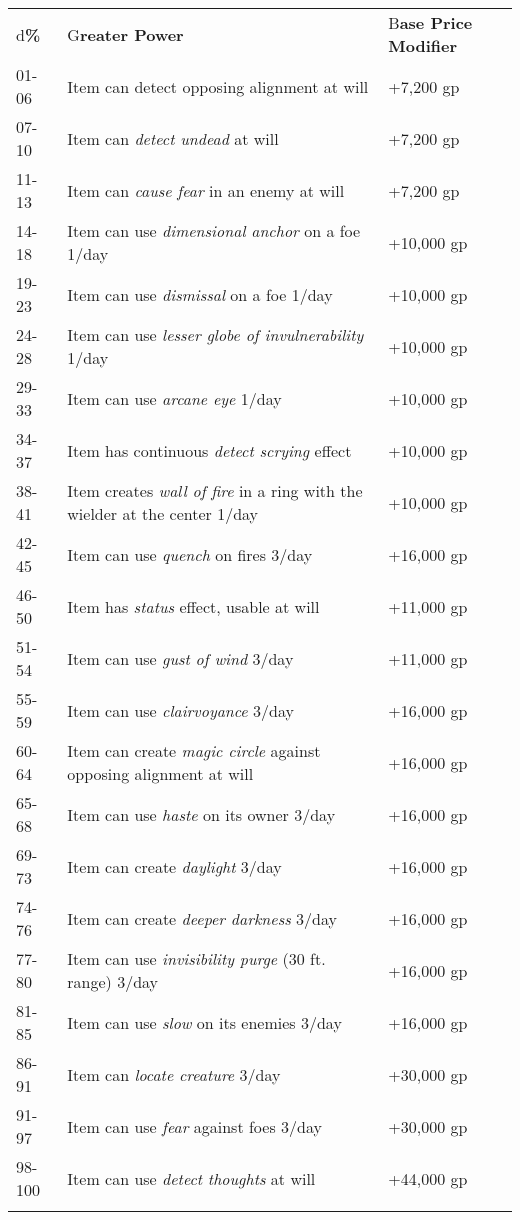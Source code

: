 \documentclass{article}
\begin{document}
\vspace{12pt}
\begin{tabular}{|>{\raggedright}p{29pt}|>{\raggedright}p{241pt}|>{\raggedright}p{43pt}|}
\hline
\multicolumn{3}{|p{314pt}|}{I\textbf{ntelligent Item Greater Powers}}\tabularnewline
\hline
d\textbf{\%} & G\textbf{reater Power} & B\textbf{ase Price}\linebreak{}
\textbf{Modifier}\tabularnewline
\hline
01-06 & Item can detect opposing alignment at will & +7,200 gp\tabularnewline
\hline
07-10 & Item can \textit{detect undead }at will & +7,200 gp\tabularnewline
\hline
11-13 & Item can \textit{cause fear }in an enemy at will & +7,200 gp\tabularnewline
\hline
14-18 & Item can use \textit{dimensional anchor }on a foe 1/day & +10,000 gp\tabularnewline
\hline
19-23 & Item can use \textit{dismissal }on a foe 1/day & +10,000 gp\tabularnewline
\hline
24-28 & Item can use \textit{lesser globe of invulnerability }1/day & +10,000 gp\tabularnewline
\hline
29-33 & Item can use \textit{arcane eye }1/day & +10,000 gp\tabularnewline
\hline
34-37 & Item has continuous \textit{detect scrying }effect & +10,000 gp\tabularnewline
\hline
38-41 & Item creates \textit{wall of fire }in a ring with the wielder at the center 
1/day & +10,000 gp\tabularnewline
\hline
42-45 & Item can use \textit{quench }on fires 3/day & +16,000 gp\tabularnewline
\hline
46-50 & Item has \textit{status }effect, usable at will & +11,000 gp\tabularnewline
\hline
51-54 & Item can use \textit{gust of wind }3/day & +11,000 gp\tabularnewline
\hline
55-59 & Item can use \textit{clairvoyance }3/day & +16,000 gp\tabularnewline
\hline
60-64 & Item can create \textit{magic circle }against opposing alignment at will & +16,000 
gp\tabularnewline
\hline
65-68 & Item can use \textit{haste }on its owner 3/day & +16,000 gp\tabularnewline
\hline
69-73 & Item can create \textit{daylight }3/day & +16,000 gp\tabularnewline
\hline
74-76 & Item can create \textit{deeper darkness }3/day & +16,000 gp\tabularnewline
\hline
77-80 & Item can use \textit{invisibility purge }(30 ft. range) 3/day & +16,000 
gp\tabularnewline
\hline
81-85 & Item can use \textit{slow }on its enemies 3/day & +16,000 gp\tabularnewline
\hline
86-91 & Item can \textit{locate creature }3/day & +30,000 gp\tabularnewline
\hline
91-97 & Item can use \textit{fear }against foes 3/day & +30,000 gp\tabularnewline
\hline
98-100 & Item can use \textit{detect thoughts }at will & +44,000 gp\tabularnewline
\hline
\multicolumn{3}{|p{314pt}|}{If the same power is rolled twice, roll again.}\tabularnewline
\hline
\end{tabular}
\end{document}
